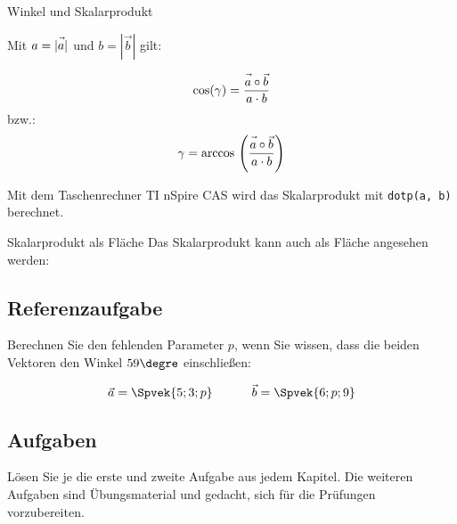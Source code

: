 \begin{gesetz}{Winkel und
    Skalarprodukt}{}


  Mit $a=|\vec{\vphantom{b}a}|$ und $b = |\vec{b}|$ gilt:
  
  $$\cos(\gamma) = \frac{\vec{a\vphantom{b}}\circ\vec{b}}{a\cdot b}$$
  bzw.:
  $$\gamma = \arccos{} \left(\frac{\vec{a\vphantom{b}}\circ\vec{b}}{a\cdot b}\right)$$
  
\end{gesetz}

Mit dem Taschenrechner TI nSpire CAS wird das Skalarprodukt mit
\texttt{dotp(a, b)} berechnet.

\begin{bemerkung}{Skalarprodukt als Fläche}{}
  Das Skalarprodukt kann auch als Fläche angesehen werden:
  
\end{bemerkung}
\newpage
\subsection{Referenzaufgabe}
Berechnen Sie den fehlenden Parameter $p$, wenn Sie wissen, dass die
beiden Vektoren den Winkel $59\degre$ einschließen:

$$\vec{a} = \Spvek{5;3;p} \hspace{11mm} \vec{b} = \Spvek{6;p;9}$$

  
  \subsection*{Aufgaben}

Lösen Sie je die erste und zweite Aufgabe aus jedem Kapitel. Die weiteren Aufgaben
sind Übungsmaterial und gedacht, sich für die Prüfungen vorzubereiten.




